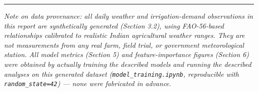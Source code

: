 \documentclass[11pt,a4paper]{article}
\begin{document}
\vspace{1em}
\noindent\rule{\textwidth}{0.4pt}

\vspace{0.5em}
\noindent\footnotesize\emph{Note on data provenance: all daily weather and
irrigation-demand observations in this report are synthetically generated
(Section 3.2), using FAO-56-based relationships calibrated to realistic Indian
agricultural weather ranges. They are not measurements from any real farm,
field trial, or government meteorological station. All model metrics
(Section 5) and feature-importance figures (Section 6) were obtained by
actually training the described models and running the described analyses on
this generated dataset (\texttt{model\_training.ipynb}, reproducible with
\texttt{random\_state=42}) --- none were fabricated in advance.}
\end{document}
